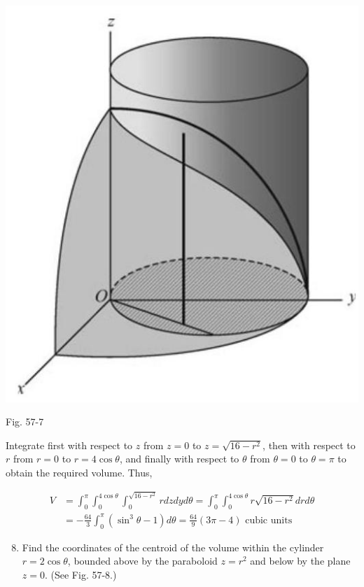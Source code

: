 \documentclass[10pt]{article}
\begin{document}
\begin{center}
\includegraphics[max width=\textwidth]{2024_04_20_fe2e8e718cc0fcd63d1bg-05(1)}
\end{center}

Fig. 57-7

Integrate first with respect to $z$ from $z=0$ to $z=\sqrt{16-r^{2}}$, then with respect to $r$ from $r=0$ to $r=4 \cos \theta$, and finally with respect to $\theta$ from $\theta=0$ to $\theta=\pi$ to obtain the required volume. Thus,

$$
\begin{aligned}
V & =\int_{0}^{\pi} \int_{0}^{4 \cos \theta} \int_{0}^{\sqrt{16-r^{2}}} r d z d y d \theta=\int_{0}^{\pi} \int_{0}^{4 \cos \theta} r \sqrt{16-r^{2}} d r d \theta \\
& =-\frac{64}{3} \int_{0}^{\pi}\left(\sin ^{3} \theta-1\right) d \theta=\frac{64}{9}(3 \pi-4) \text { cubic units }
\end{aligned}
$$

\begin{enumerate}
  \setcounter{enumi}{7}
  \item Find the coordinates of the centroid of the volume within the cylinder $r=2 \cos \theta$, bounded above by the paraboloid $z=r^{2}$ and below by the plane $z=0$. (See Fig. 57-8.)
\end{enumerate}
\end{document}
